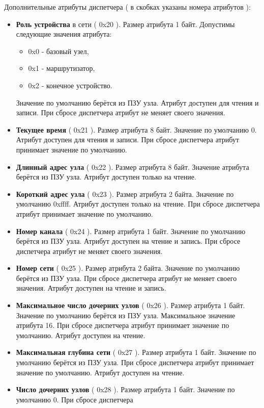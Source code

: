 Дополнительные атрибуты диспетчера ( в скобках указаны номера атрибутов ):
\begin{itemize}
\item {\bfseries Роль устройства} в сети ( 0x20 ). Размер атрибута 1 байт. Допустимы следующие значения атрибута:
    \begin{itemize}
        \item 0x0 - базовый узел,
        \item 0x1 - маршрутизатор,
        \item 0x2 - конечное устройство.
    \end{itemize}
Значение по умолчанию берётся из ПЗУ узла. Атрибут доступен для чтения и записи. 
При сбросе диспетчера атрибут не меняет своего значения.
\item {\bfseries Текущее время} ( 0x21 ). Размер атрибута 8 байт. Значение по умолчанию 0. Атрибут доступен
для чтения и записи. При сбросе диспетчера атрибут принимает значение по умолчанию.
\item {\bfseries Длинный адрес узла} ( 0x22 ). Размер атрибута 8 байт. Значение атрибута берётся из ПЗУ узла.
Атрибут доступен только на чтение.
\item {\bfseries Короткий адрес узла} ( 0x23 ). Размер атрибута 2 байта. Значение по умолчанию 0xffff.
Атрибут доступен только на чтение. При сбросе диспетчера атрибут принимает значение по умолчанию.
\item {\bfseries Номер канала} ( 0x24 ). Размер атрибута 1 байт. Значение по умолчанию берётся из ПЗУ узла.
Атрибут доступен на чтение и запись. При сбросе диспетчера атрибут не меняет своего значения.
\item {\bfseries Номер сети} ( 0x25 ). Размер атрибута 2 байта. Значение по умолчанию берётся из ПЗУ узла.
При сбросе диспетчера атрибут не меняет своего значения. Атрибут доступен на чтение и запись.
\item {\bfseries Максимальное число дочерних узлов} ( 0x26 ). Размер атрибута 1 байт. Значение по умолчанию берётся из
ПЗУ узла. Максимальное значение атрибута 16. При сбросе диспетчера атрибут принимает значение по умолчанию.
Атрибут доступен на чтение.
\item {\bfseries Максимальная глубина сети} ( 0x27 ). Размер атрибута 1 байт. Значение по умолчанию берётся из
ПЗУ узла. При сбросе диспетчера атрибут принимает значение по умолчанию. Атрибут доступен на чтение.
\item {\bfseries Число дочерних узлов} ( 0x28 ). Размер атрибута 1 байт. Значение по умолчанию 0. При сбросе диспетчера

\end{itemize}
